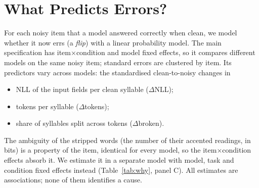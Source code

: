 \documentclass[conference]{IEEEtran}
\begin{document}
\section{What Predicts Errors?}\label{sec:why}

For each noisy item that a model answered correctly when clean, we model whether it now errs (a \emph{flip}) with a linear probability model. The main specification has item$\times$condition and model fixed effects, so it compares different models on the same noisy item; standard errors are clustered by item. Its predictors vary across models: the standardised clean-to-noisy changes in
\begin{itemize}
\item NLL of the input fields per clean syllable ($\Delta$NLL);
\item tokens per syllable ($\Delta$tokens);
\item share of syllables split across tokens ($\Delta$broken).
\end{itemize}
The ambiguity of the stripped words (the number of their accented readings, in bits) is a property of the item, identical for every model, so the item$\times$condition effects absorb it. We estimate it in a separate model with model, task and condition fixed effects instead (Table~\ref{tab:why}, panel C). All estimates are associations; none of them identifies a cause.
\end{document}
